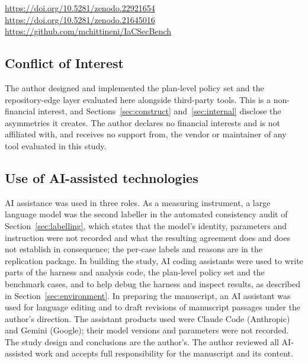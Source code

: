 \documentclass[smallextended]{svjour3}
\begin{document}
\begin{center}
\url{https://doi.org/10.5281/zenodo.22921654}\\
\url{https://doi.org/10.5281/zenodo.21645016}\\
\url{https://github.com/mchittineni/IaCSecBench}
\end{center}

\subsection*{Conflict of Interest}
The author designed and implemented the plan-level
policy set and the repository-edge layer evaluated here alongside third-party
tools. This is a non-financial interest, and Sections~\ref{sec:construct}
and~\ref{sec:internal} disclose the asymmetries it creates. The author declares no financial interests and is not
affiliated with, and receives no support from, the vendor or
maintainer of any tool evaluated in this study.

\subsection*{Use of AI-assisted technologies}
AI assistance was used in three
roles. As a measuring instrument, a large language model was the second labeller
in the automated consistency audit of Section~\ref{sec:labelling}, which states
that the model's identity, parameters and instruction were not recorded and what
the resulting agreement does and does not establish in consequence; the per-case
labels and reasons are in the replication package. In building the study, AI
coding assistants were used to write parts of the harness and analysis code, the
plan-level policy set and the benchmark cases, and to help debug the harness and
inspect results, as described in Section~\ref{sec:environment}. In preparing the
manuscript, an AI assistant was used for language editing and to draft revisions
of manuscript passages under the author's direction. The assistant products used were Claude Code (Anthropic) and Gemini
(Google); their model versions and parameters were not recorded. The study design and conclusions are
the author's. The author reviewed all AI-assisted work and accepts full
responsibility for the manuscript and its content.


\end{document}
